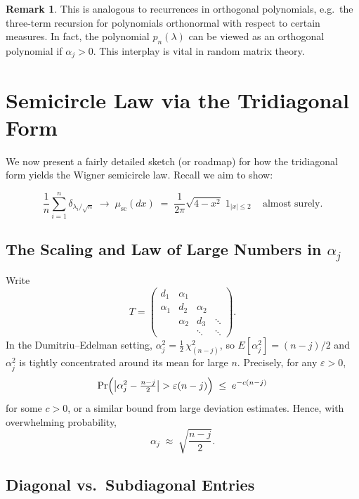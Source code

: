 \documentclass[letterpaper,11pt,oneside,reqno]{article}
\numberwithin{equation}{section}
\theoremstyle{definition}
\newtheorem{remark}[proposition]{Remark}
\begin{document}
\begin{remark}
This is analogous to recurrences in orthogonal polynomials, e.g.\ the three-term recursion for polynomials orthonormal with respect to certain measures. In fact, the polynomial $p_n(\lambda)$ can be viewed as an orthogonal polynomial if $\alpha_j>0$. This interplay is vital in random matrix theory.
\end{remark}


\section{Semicircle Law via the Tridiagonal Form}
\label{sec:semicircle-tridiag}

We now present a fairly detailed sketch (or roadmap) for how the tridiagonal form yields the Wigner semicircle law. Recall we aim to show:

\[
  \frac{1}{n}\sum_{i=1}^n \delta_{\lambda_i/\sqrt{n}}
  \;\longrightarrow\;
  \mu_{\mathrm{sc}}(dx)\;=\;\frac{1}{2\pi}\sqrt{4 - x^2}\; 1_{|x|\le2}\,
  \quad\text{almost surely}.
\]

\subsection{The Scaling and Law of Large Numbers in \(\alpha_j\)}

Write
\[
  T = \begin{pmatrix}
    d_1 & \alpha_1 & & \\
    \alpha_1 & d_2 & \alpha_2 & \\
    & \alpha_2 & d_3 & \ddots \\
    & & \ddots & \ddots
  \end{pmatrix}.
\]
In the Dumitriu--Edelman setting, $\alpha_j^2 = \frac{1}{2}\,\chi^2_{(n-j)}$, so $ E[\alpha_j^2]=(n-j)/2$ and $\alpha_j^2$ is tightly concentrated around its mean for large $n$. Precisely, for any $\varepsilon>0$,
\[
  \Pr\Bigl(\bigl|\alpha_j^2 - \tfrac{n-j}{2}\bigr| > \varepsilon (n-j)\Bigr)
  \;\le\; e^{-c(n-j)}
\]
for some $c>0$, or a similar bound from large deviation estimates. Hence, with overwhelming probability,
\[
  \alpha_j \;\approx\; \sqrt{\frac{n-j}{2}}.
\]

\subsection{Diagonal vs.\ Subdiagonal Entries}
\end{document}
